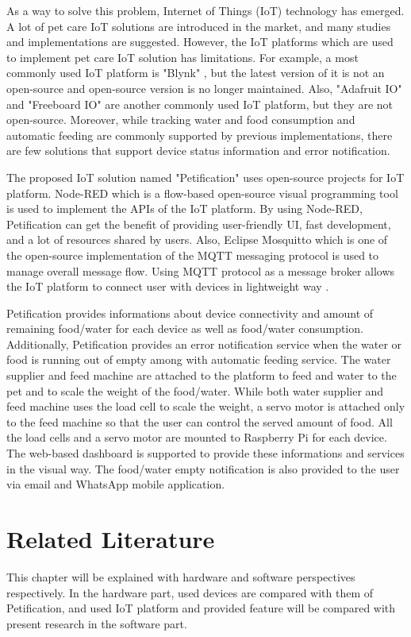 \documentclass[conference]{IEEEtran}
\begin{document}
As a way to solve this problem, Internet of Things (IoT) technology has emerged. A lot of pet care IoT solutions are introduced in the market, and many studies and implementations are suggested.
However, the IoT platforms which are used to implement pet care IoT solution has limitations. For example, a most commonly used IoT platform is "Blynk" \cite{b2, b3, b4, b5}, but the latest version of it is not an open-source and open-source version is no longer maintained. Also, "Adafruit IO" \cite{b6} and "Freeboard IO" \cite{b7} are another commonly used IoT platform, but they are not open-source.
Moreover, while tracking water and food consumption and automatic feeding are commonly supported by previous implementations, there are few solutions that support device status information and error notification.

The proposed IoT solution named "Petification" uses open-source projects for IoT platform. Node-RED which is a flow-based open-source visual programming tool \cite{b8} is used to implement the APIs of the IoT platform. By using Node-RED, Petification can get the benefit of providing user-friendly UI, fast development, and a lot of resources shared by users. Also, Eclipse Mosquitto which is one of the open-source implementation of the MQTT messaging protocol is used to manage overall message flow. Using MQTT protocol as a message broker allows the IoT platform to connect user with devices in lightweight way \cite{b9}.

Petification provides informations about device connectivity and amount of remaining  food/water for each device as well as food/water consumption. Additionally, Petification provides an error notification service when the water or food is running out of empty among with automatic feeding service.
The water supplier and feed machine are attached to the platform to feed and water to the pet and to scale the weight of the food/water. While both water supplier and feed machine uses the load cell to scale the weight, a servo motor is attached only to the feed machine so that the user can control the served amount of food. All the load cells and a servo motor are mounted to Raspberry Pi for each device.
The web-based dashboard is supported to provide these informations and services in the visual way. The food/water empty notification is also provided to the user via email and WhatsApp mobile application.

\section{Related Literature}
This chapter will be explained with hardware and software perspectives respectively. In the hardware part, used devices are compared with them of Petification, and used IoT platform and provided feature will be compared with present research in the software part.
\end{document}
